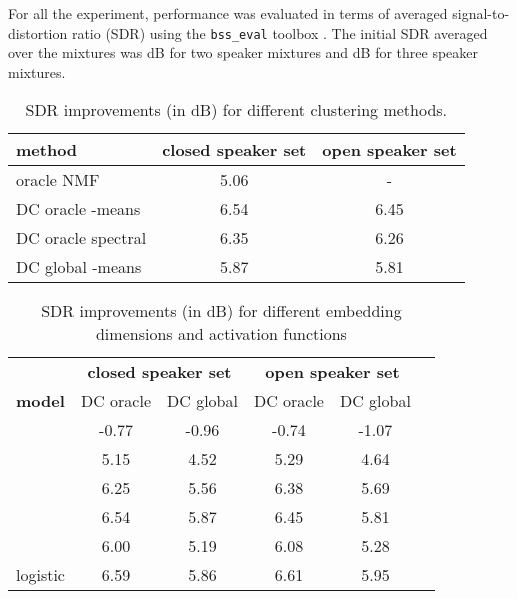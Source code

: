 \documentclass[9pt]{article} \usepackage{nips15submit_e,times}
\begin{document}
For all the experiment, performance was evaluated in terms of averaged signal-to-distortion ratio (SDR)
using the \verb|bss_eval| toolbox \cite{vincent2006performance}. 
The initial SDR averaged over the mixtures was  dB for two speaker mixtures and  dB for three speaker mixtures.




\begin{table}[t]
\caption{SDR improvements (in dB) for different clustering methods. }
\label{tab:K40}
\begin{center}
{\small
\begin{tabular}{lcc}
\hline 
\multicolumn{1}{l}{\bf method}  &\multicolumn{1}{c}{\bf closed speaker set}  &\multicolumn{1}{c}{\bf open speaker set } 
 \\
 \hline
oracle NMF  & 5.06 & - 
\\\hline
DC oracle -means      &  6.54 & 6.45\\
DC oracle spectral       &  6.35 &6.26 \\
DC global -means    & 5.87   &5.81 \\
\end{tabular}
}
\end{center}
\vspace{-0.7cm}
\end{table}


\begin{table}[t]
\caption{SDR improvements (in dB) for different embedding dimensions  and activation functions}
\label{tab:diff_K}
\begin{center}
{\small
\begin{tabular}{lccccc}
\hline 
 &\multicolumn{2}{c}{\bf closed speaker set }  &\multicolumn{2}{c}{\bf open speaker set } \\
 \multicolumn{1}{l}{\bf model}  & DC oracle  &DC global & DC oracle  &DC global
\\ \hline      
      &  -0.77 & -0.96 &  -0.74 & -1.07\\
      &  5.15 &4.52  & 5.29 &4.64\\
   &  6.25&5.56 &  6.38&5.69\\
    & 6.54   &5.87 & 6.45  &5.81 \\
   &6.00  &5.19 & 6.08 &5.28\\
 \hline  
 logistic  & 6.59  &5.86  & 6.61 &5.95\\
\end{tabular}
}
\end{center}
\vspace{-0.5cm}
\end{table}
\end{document}
